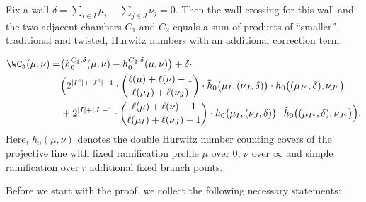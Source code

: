 \begin{prop}
\label{thm-wc}

Fix a wall $\delta=\sum_{i\in I}\mu_i - \sum_{j\in J}\nu_j=0$.
Then the wall crossing for this wall and the two adjacent chambers $C_1$ and $C_2$ equals a sum of products of ``smaller'', traditional and twisted, Hurwitz numbers with an additional correction term:

\begin{align*}
\WC_{\delta}(\mu,\nu)= &\big(h_0^{C_1,\delta}(\mu,\nu)- h_0^{C_2,\delta}(\mu,\nu)\big)+
  \delta\cdot \\
&\Big(2^{|I^c|+|J^c|-1}\cdot\binom{\ell(\mu)+\ell(\nu)-1}{\ell(\mu_I)+\ell(\nu_J)}\cdot \tilde{h}_0\big(\mu_I,(\nu_J,\delta)\big)\cdot h_0\big((\mu_{I^c},\delta),\nu_{J^c}\big)
\\&+2^{|I|+|J|-1}\cdot\binom{\ell(\mu)+\ell(\nu)-1}{\ell(\mu_I)+\ell(\nu_J)-1}\cdot h_0\big(\mu_I,(\nu_J,\delta)\big)\cdot \tilde{h}_0\big((\mu_{I^c},\delta),\nu_{J^c}\big)\Big).
\end{align*}
Here, $h_0(\mu,\nu)$ denotes the double Hurwitz number counting covers of the projective line with fixed ramification profile $\mu$ over $0$, $\nu$ over $\infty$ and simple ramification over $r$ additional fixed branch points.
\end{prop}

Before we start with the proof, we collect the following necessary statements:

